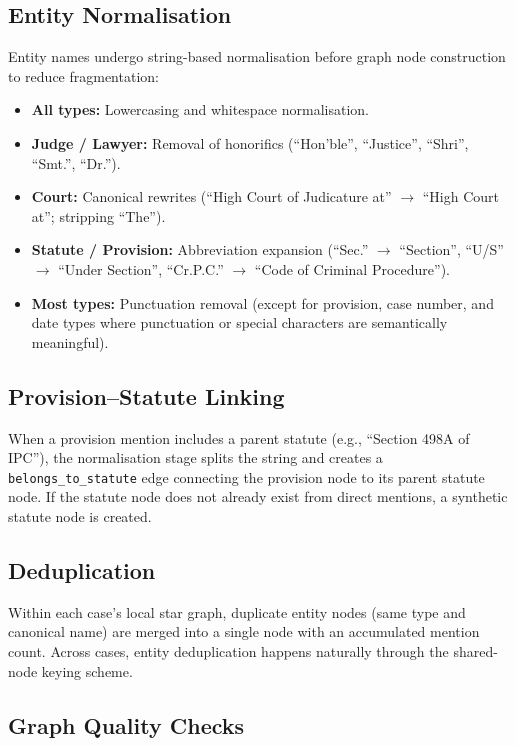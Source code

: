 \subsection{Entity Normalisation}

Entity names undergo string-based normalisation before graph node construction to reduce fragmentation:

\begin{itemize}
    \item \textbf{All types:} Lowercasing and whitespace normalisation.
    \item \textbf{Judge / Lawyer:} Removal of honorifics (``Hon'ble'', ``Justice'', ``Shri'', ``Smt.'', ``Dr.'').
    \item \textbf{Court:} Canonical rewrites (``High Court of Judicature at'' $\to$ ``High Court at''; stripping ``The'').
    \item \textbf{Statute / Provision:} Abbreviation expansion (``Sec.'' $\to$ ``Section'', ``U/S'' $\to$ ``Under Section'', ``Cr.P.C.'' $\to$ ``Code of Criminal Procedure'').
    \item \textbf{Most types:} Punctuation removal (except for provision, case number, and date types where punctuation or special characters are semantically meaningful).
\end{itemize}

\subsection{Provision–Statute Linking}

When a provision mention includes a parent statute (e.g., ``Section 498A of IPC''), the normalisation stage splits the string and creates a \texttt{belongs\_to\_statute} edge connecting the provision node to its parent statute node. If the statute node does not already exist from direct mentions, a synthetic statute node is created.

\subsection{Deduplication}

Within each case's local star graph, duplicate entity nodes (same type and canonical name) are merged into a single node with an accumulated mention count. Across cases, entity deduplication happens naturally through the shared-node keying scheme.

\subsection{Graph Quality Checks}

